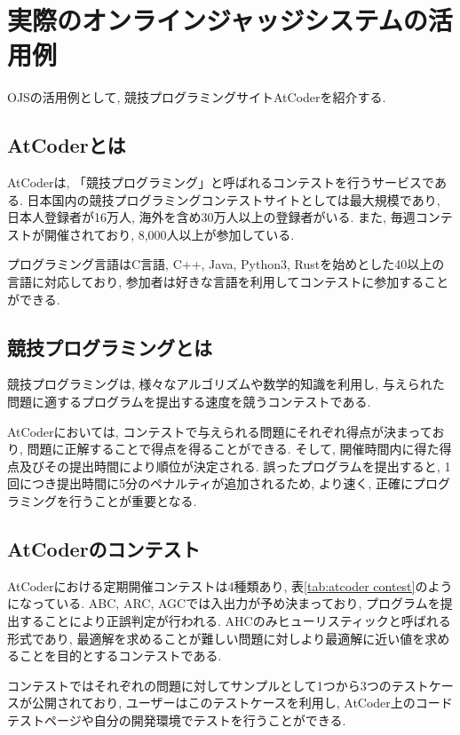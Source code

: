 
\section{実際のオンラインジャッジシステムの活用例}

OJSの活用例として, 競技プログラミングサイトAtCoder\cite{AtCoder}を紹介する. 

\subsection{AtCoderとは}

AtCoderは, 「競技プログラミング」と呼ばれるコンテストを行うサービスである. 
日本国内の競技プログラミングコンテストサイトとしては最大規模であり, 日本人登録者が16万人, 海外を含め30万人以上の登録者がいる. 
また, 毎週コンテストが開催されており, 8,000人以上が参加している. 

プログラミング言語はC言語, C++, Java, Python3, Rustを始めとした40以上の言語に対応しており, 参加者は好きな言語を利用してコンテストに参加することができる. 

\subsection{競技プログラミングとは}
競技プログラミングは, 様々なアルゴリズムや数学的知識を利用し, 与えられた問題に適するプログラムを提出する速度を競うコンテストである. 

AtCoderにおいては, コンテストで与えられる問題にそれぞれ得点が決まっており, 問題に正解することで得点を得ることができる. 
そして, 開催時間内に得た得点及びその提出時間により順位が決定される. 
誤ったプログラムを提出すると, 1回につき提出時間に5分のペナルティが追加されるため, より速く, 正確にプログラミングを行うことが重要となる. 

\subsection{AtCoderのコンテスト}
AtCoderにおける定期開催コンテストは4種類あり, 表\ref{tab:atcoder contest}のようになっている. 
ABC, ARC, AGCでは入出力が予め決まっており, プログラムを提出することにより正誤判定が行われる. 
AHCのみヒューリスティックと呼ばれる形式であり, 最適解を求めることが難しい問題に対しより最適解に近い値を求めることを目的とするコンテストである. 

コンテストではそれぞれの問題に対してサンプルとして1つから3つのテストケースが公開されており, ユーザーはこのテストケースを利用し, AtCoder上のコードテストページや自分の開発環境でテストを行うことができる. 


